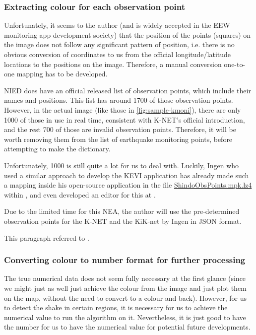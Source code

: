 \subsubsection{Extracting colour for each observation point}

Unfortunately, it seems to the author (and is widely accepted in the EEW monitoring app development society) that the position of the points (squares) on the image does not follow any significant pattern of position, i.e. there is no obvious conversion of coordinates to us from the official longitude/latitude locations to the positions on the image. Therefore, a manual conversion one-to-one mapping has to be developed.

NIED does have an official released list of observation points, which include their names and positions. This list has around 1700 of those observation points. However, in the actual image (like those in \autoref{fig:sample-kmoni}), there are only 1000 of those in use in real time, consistent with K-NET's official introduction, and the rest 700 of those are invalid observation points. Therefore, it will be worth removing them from the list of earthquake monitoring points, before attempting to make the dictionary.

Unfortunately, 1000 is still quite a lot for us to deal with. Luckily, Ingen who used a similar approach to develop the KEVI application has already made such a mapping inside his open-source application in the file \href{https://github.com/ingen084/KyoshinEewViewerIngen/blob/develop/src/KyoshinEewViewer/Assets/ShindoObsPoints.mpk.lz4}{ShindoObsPoints.mpk.lz4} \autocite{soft-kyoshin-data} within  \autocite{soft-kevi-github}, and even developed an editor for this at  \autocite{soft-kyoshin-shindo-place-editor}.

Due to the limited time for this NEA, the author will use the pre-determined observation points for the K-NET and the KiK-net by Ingen in JSON format.

This paragraph referred to \autocite{blog-ingen-kmoni-data}.

\subsubsection{Converting colour to number format for further processing}

The true numerical data does not seem fully necessary at the first glance (since we might just as well just achieve the colour from the image and just plot them on the map, without the need to convert to a colour and back). However, for us to detect the shake in certain regions, it is necessary for us to achieve the numerical value to run the algorithm on it. Nevertheless, it is just good to have the number for us to have the numerical value for potential future developments.

